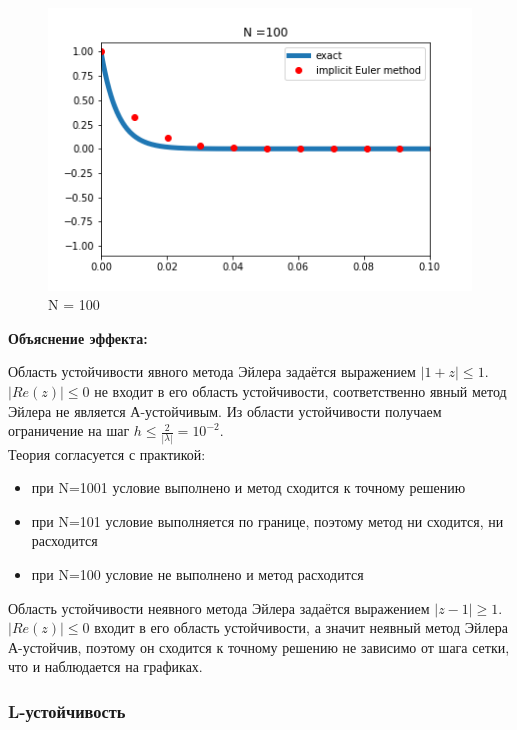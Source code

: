 \documentclass[11pt]{article}
\begin{document}
\begin{figure}[h]
\begin{center}
\begin{minipage}[h]{0.3\linewidth}
    \label{p3}
    \end{minipage}
    \hfill
    \begin{minipage}[h]{0.3\linewidth}
    \includegraphics[width=1\linewidth]{implicit_100.png}
    \caption{N = 100}
    \label{p3}
    \end{minipage}
    \end{center}
    \end{figure}

\textbf{Объяснение эффекта:}
   
    Область устойчивости явного метода Эйлера задаётся выражением
\(|1+z|\leq 1\). \(|Re(z)|\leq 0\) не входит в его область устойчивости,
соответственно явный метод Эйлера не является А-устойчивым. Из области
устойчивости получаем ограничение на шаг
\(h\leq \frac{2}{|\lambda|}=10^{-2}\).  \\
Теория согласуется с практикой: 
\begin{itemize}
    \item при N=1001 условие выполнено и метод сходится к точному решению
    \item при N=101 условие выполняется по границе, поэтому метод ни сходится, ни расходится
    \item при N=100 условие не выполнено и метод расходится
\end{itemize}


Область устойчивости неявного метода Эйлера задаётся выражением
\(|z-1|\geq1\). \(|Re(z)|\leq 0\) входит в его область устойчивости, а
значит неявный метод Эйлера А-устойчив, поэтому он сходится к точному
решению не зависимо от шага сетки, что и наблюдается на графиках.

    \hypertarget{l-ux443ux441ux442ux43eux439ux447ux438ux432ux43eux441ux442ux44c}{%
\subsubsection{L-устойчивость}\label{l-ux443ux441ux442ux43eux439ux447ux438ux432ux43eux441ux442ux44c}}
\end{document}
